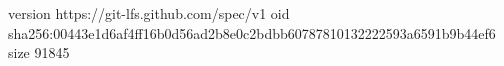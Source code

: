 version https://git-lfs.github.com/spec/v1
oid sha256:00443e1d6af4ff16b0d56ad2b8e0c2bdbb60787810132222593a6591b9b44ef6
size 91845
